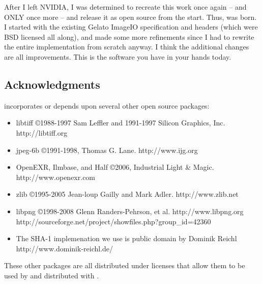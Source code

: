 After I left NVIDIA, I was determined to recreate this work once
again -- and ONLY once more -- and release it as open source from the
start.  Thus, \product was born.  I started with the existing Gelato
ImageIO specification and headers (which were BSD licensed all along),
and made some more refinements since I had to rewrite the entire
implementation from scratch anyway.  I think the additional changes are
all improvements.  This is the software you have in your hands today.


\subsection*{Acknowledgments}

\begin{comment}
The direct precursor to \product was Gelato's ImageIO, which was
co-designed and implemented by Larry Gritz, Dan Wexler, Jonathan Rice, Eric
Enderton, and Philip Nemec.

Big thanks to our bosses at NVIDIA for allowing us to share the API spec
and headers under the BSD license.  And thanks to their inability to
open source their own implementation in a timely manner, I was forced to
create this clearly superior descendant.
\end{comment}

\product incorporates or depends upon several other open source
packages:

\begin{itemize}
\item {\cf libtiff} \copyright 1988-1997 Sam Leffler and 1991-1997 Silicon
Graphics, Inc. \\ {\cf http://libtiff.org}
\item {\cf jpeg-6b} \copyright 1991-1998, Thomas G. Lane.  {\cf http://www.ijg.org}
\item OpenEXR, Ilmbase, and Half \copyright 2006, Industrial Light \& Magic.\\
{\cf http://www.openexr.com}
\item {\cf zlib} \copyright 1995-2005 Jean-loup Gailly and Mark Adler. 
{\cf http://www.zlib.net}
\item {\cf libpng} \copyright 1998-2008 Glenn Randers-Pehrson, et al.  
{\cf http://www.libpng.org}
{\cf http://sourceforge.net/project/showfiles.php?group_id=42360}
\item The SHA-1 implemenation we use is public domain by
Dominik Reichl {\cf http://www.dominik-reichl.de/}
\end{itemize}

These other packages are all distributed under licenses that allow them
to be used by and distributed with \product.

\chapwidthend

